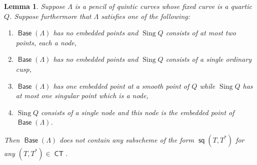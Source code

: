 \documentclass[reqno, 11pt]{amsart}
\theoremstyle{plain}
\newtheorem{lemma}[theorem]{Lemma}
\theoremstyle{remark}
\DeclareMathOperator{\CT}{\mathsf{CT}}
\DeclareMathOperator{\s}{\mathsf{sq}}
\DeclareMathOperator{\Base}{\mathsf{Base}}
\DeclareMathOperator{\Sing}{Sing}
\begin{document}
\begin{lemma}
    \label{lemma:QLNo}
    Suppose $\Lambda$ is a pencil of quintic curves whose fixed curve is a quartic $Q$.
    Suppose furthermore that $\Lambda$ satisfies one of the following: 
    \begin{enumerate}
        \item[(a)] $\Base(\Lambda)$ has no embedded points and $\Sing Q$ consists of at most two points, each a node,
        \item[(b)] $\Base(\Lambda)$ has no embedded points and $\Sing Q$ consists of a single ordinary cusp,
        \item[(c)] $\Base(\Lambda)$ has one embedded point at a smooth point of $Q$ while $\Sing Q$ has at most one singular point which is a node,
        \item[(d)] $\Sing Q$ consists of a single node and this node is the embedded point of $\Base(\Lambda)$.
    \end{enumerate}

    Then $\Base (\Lambda)$ does not contain any subscheme of the form $\s(T,T^{*})$ for any $(T,T^{*}) \in \CT$.
\end{lemma}
\end{document}
